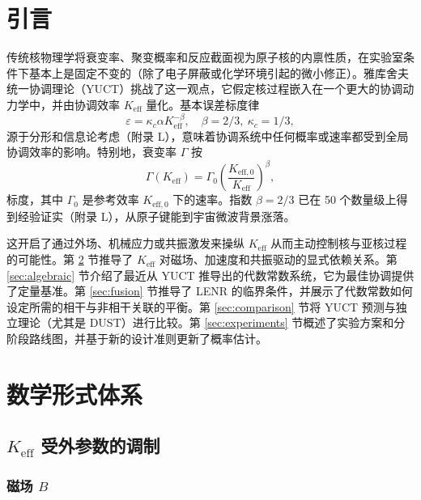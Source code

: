 \documentclass[12pt]{article}
\theoremstyle{remark}
\newcommand{\Keff}{K_{\mathrm{eff}}}
\newcommand{\Keffzero}{K_{\mathrm{eff},0}}
\begin{document}
	\tableofcontents
	\newpage
	
	\section{引言}
	\label{sec:intro}
	
	传统核物理学将衰变率、聚变概率和反应截面视为原子核的内禀性质，在实验室条件下基本上是固定不变的（除了电子屏蔽或化学环境引起的微小修正）。雅库舍夫统一协调理论（YUCT）挑战了这一观点，它假定核过程嵌入在一个更大的协调动力学中，并由协调效率 \(\Keff\) 量化。基本误差标度律
	\begin{equation}
		\varepsilon = \kappa_c \alpha \Keff^{-\beta}, \quad \beta = 2/3,\ \kappa_c = 1/3,
		\label{eq:universal-scaling}
	\end{equation}
	源于分形和信息论考虑（附录 L），意味着协调系统中任何概率或速率都受到全局协调效率的影响。特别地，衰变率 \(\Gamma\) 按
	\begin{equation}
		\Gamma(\Keff) = \Gamma_0 \left( \frac{\Keffzero}{\Keff} \right)^{\beta},
		\label{eq:decay-rate}
	\end{equation}
	标度，其中 \(\Gamma_0\) 是参考效率 \(\Keffzero\) 下的速率。指数 \(\beta = 2/3\) 已在 50 个数量级上得到经验证实（附录 L），从原子键能到宇宙微波背景涨落。
	
	这开启了通过外场、机械应力或共振激发来操纵 \(\Keff\) 从而主动控制核与亚核过程的可能性。第 \ref{sec:math} 节推导了 \(\Keff\) 对磁场、加速度和共振驱动的显式依赖关系。第 \ref{sec:algebraic} 节介绍了最近从 YUCT 推导出的代数常数系统，它为最佳协调提供了定量基准。第 \ref{sec:fusion} 节推导了 LENR 的临界条件，并展示了代数常数如何设定所需的相干与非相干关联的平衡。第 \ref{sec:comparison} 节将 YUCT 预测与独立理论（尤其是 DUST）进行比较。第 \ref{sec:experiments} 节概述了实验方案和分阶段路线图，并基于新的设计准则更新了概率估计。
	
	\section{数学形式体系}
	\label{sec:math}
	
	\subsection{\(\Keff\) 受外参数的调制}
	
	\subsubsection{磁场 \(B\)}
	
\end{document}
